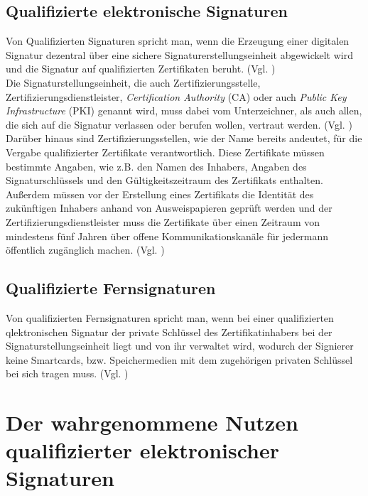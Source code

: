 \documentclass[deutsch]{lib/llncs/llncs}
\begin{document}
\subsection{Qualifizierte elektronische Signaturen}
Von Qualifizierten Signaturen spricht man, wenn die Erzeugung einer digitalen Signatur dezentral über eine sichere Signaturerstellungseinheit abgewickelt wird und die Signatur auf qualifizierten Zertifikaten beruht. (Vgl. \cite[S. 8]{Zitat07}) \\
Die Signaturstellungseinheit, die auch Zertifizierungsstelle, Zertifizierungsdienstleister, \textit{Certification Authority} (CA) oder auch \textit{Public Key Infrastructure} (PKI) genannt wird, muss dabei vom Unterzeichner, als auch allen, die sich auf die Signatur verlassen oder berufen wollen, vertraut werden. (Vgl. \cite[S. 9]{Zitat07}) \\
Darüber hinaus sind Zertifizierungsstellen, wie der Name bereits andeutet, für die Vergabe qualifizierter Zertifikate verantwortlich. 
Diese Zertifikate müssen bestimmte Angaben, wie z.B. den Namen des Inhabers, Angaben des Signaturschlüssels und den Gültigkeitszeitraum des Zertifikats enthalten. Außerdem müssen vor der Erstellung eines Zertifikats die Identität des zukünftigen Inhabers anhand von Ausweispapieren geprüft werden und der Zertifizierungsdienstleister muss die Zertifikate über einen Zeitraum von mindestens fünf Jahren über offene Kommunikationskanäle für jedermann öffentlich zugänglich machen. (Vgl. \cite[S. 9]{Zitat07}) 


\subsection{Qualifizierte Fernsignaturen}
Von qualifizierten Fernsignaturen spricht man, wenn bei einer qualifizierten qlektronischen Signatur der private Schlüssel des Zertifikatinhabers bei der Signaturstellungseinheit liegt und von ihr verwaltet wird, wodurch der Signierer keine Smartcards, bzw. Speichermedien mit dem zugehörigen privaten Schlüssel bei sich tragen muss. (Vgl. \cite[S. 30]{Zitat08})


\section{Der wahrgenommene Nutzen qualifizierter elektronischer Signaturen}
\end{document}
